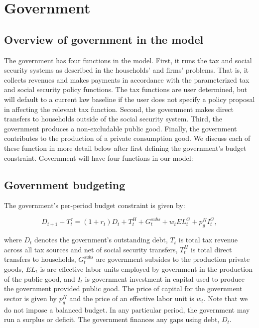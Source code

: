 \chapter{Government}
%





\section{Overview of government in the model}

The government has four functions in the model.  First, it runs the tax and social security systems as described in the households' and firms' problems.  That is, it collects revenues and makes payments in accordance with the parameterized tax and social security policy functions.  The tax functions are user determined, but will default to a current law baseline if the user does not specify a policy proposal in affecting the relevant tax function.  Second, the government makes direct transfers to households outside of the social security system.  Third, the government produces a non-excludable public good.  Finally, the government contributes to the production of a private consumption good.  We discuss each of these function in more detail below after first defining the government's budget constraint.
Government will have four functions in our model:


\section{Government budgeting}

The government's per-period budget constraint is given by: 

      \begin{equation}
      \label{eqn:gbc}
      D_{t+1} + T^{\tau}_{t} = (1+r_{t})D_{t} + T^{H}_{t} + G^{subs}_{t} + w_{t}EL^{G}_{t} + p^{K}_{g}I^{G}_{t},
      \end{equation}

where $D_t$ denotes the government's outstanding debt, $T_t$ is total tax revenue across all tax sources and net of social security transfers, $T^H_t$ is total direct transfers to households, $G^{subs}_t$ are government subsides to the production private goods, $EL_t$ is are effective labor units employed by government in the production of the public good, and $I_t$ is government investment in capital used to produce the government provided public good.  The price of capital for the government sector is given by $p^{K}_{g}$ and the price of an effective labor unit is $w_{t}$.  Note that we do not impose a balanced budget.  In any particular period, the government may run a surplus or deficit.  The government finances any gaps using debt, $D_{t}$.  



